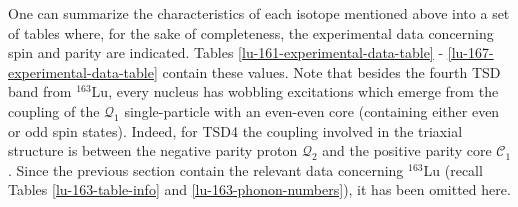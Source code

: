 One can summarize the characteristics of each isotope mentioned above into a set of tables where, for the sake of completeness, the experimental data concerning spin and parity are indicated. Tables \ref{lu-161-experimental-data-table} - \ref{lu-167-experimental-data-table} contain these values. Note that besides the fourth TSD band from $^{163}$Lu, every nucleus has wobbling excitations which emerge from the coupling of the $\mathcal{Q}_1$ single-particle with an even-even core (containing either even or odd spin states). Indeed, for TSD4 the coupling involved in the triaxial structure is between the negative parity proton $\mathcal{Q}_2$ and the positive parity core $\mathscr{C}_1$. Since the previous section contain the relevant data concerning $^{163}$Lu (recall Tables \ref{lu-163-table-info} and \ref{lu-163-phonon-numbers}), it has been omitted here.
\begin{table}
    \centering
    \caption{The data concerning spin and parity assignments for $^{161}$Lu that are required for the numerical calculations of the excitation energies. The wobbling phonon numbers from Eq. \ref{phononic-term-tsd-energies} are also shown. For both bands there is only one single-particle, i.e., $\mathcal{Q}_1$. The even/odd dissimilarity between core states of the two bands are emphasized through the fourth column ($\mathscr{C}$). The band-head $I_b$ for the isotope is also given in the last column.}
    \label{lu-161-experimental-data-table}
\end{table}

